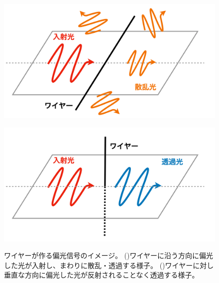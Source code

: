 \documentclass[../../main.tex]{subfiles}
\begin{document}
\begin{figure}[H]
    \begin{minipage}[b]{0.48\columnwidth}
        \centering
        \includegraphics[width=\columnwidth]{wiregrid/wire_reflect.pdf}
        \subcaption{}
        \label{fig:wire_reflect}
    \end{minipage}
    \hspace{0.02\columnwidth}
    \begin{minipage}[b]{0.48\columnwidth}
        \centering
        \includegraphics[width=\columnwidth]{wiregrid/wire_through.pdf}
        \subcaption{}
        \label{fig:wire_through}
    \end{minipage}
    \centering
    \caption{ワイヤーが作る偏光信号のイメージ。
             ()ワイヤーに沿う方向に偏光した光が入射し、まわりに散乱・透過する様子。
             ()ワイヤーに対し垂直な方向に偏光した光が反射されることなく透過する様子。
             }
    \label{fig:wire_polarization}
\end{figure}
\end{document}
